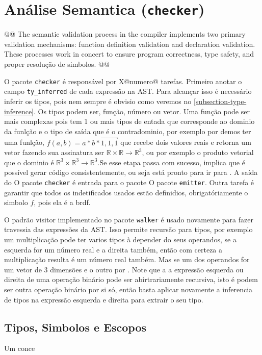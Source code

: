 
\section{Análise Semantica (\texttt{checker})} \label{section-checker}

@@ 
The semantic validation process in the compiler implements two primary validation mechanisms: function definition validation and declaration validation. These processes work in concert to ensure program correctness, type safety, and proper resolução de simbolos.
@@

O pacote \texttt{checker} é responsável por X@numero@ tarefas. Primeiro anotar o campo \verb"ty_inferred" de cada expressão na AST. Para alcançar isso é necessário inferir os tipos, pois nem sempre é obvisio como veremos no \autoref{subsection-type-inference}. Os tipos podem ser, função, número ou vetor. Uma função pode ser mais complexas pois tem 1 ou mais tipos de entada que corresponde ao dominio da funlção e  o tipo de saída que é o contradominio, por exemplo por demos ter uma funlção, $f(a,b) = a*b*\vec{1,1,1}$ que recebe dois valores reais e retorna um vetor fazendo sua assinatura ser $\mathbb{R}\times\mathbb{R} \to \mathbb{R}^3$, ou por exemplo o produto vetorial que o dominio é $\mathbb{R}^3\times\mathbb{R}^3 \to \mathbb{R}^3$.Se esse etapa passa com sucesso, implica que é possível gerar código consistentemente, ou seja está pronto para ir para . A saída do O pacote \texttt{checker} é entrada para o pacote O pacote \texttt{emitter}. Outra tarefa é garantir que todos os indetificados usados estão definidios, obrigatóriamente o simbolo $f$, pois ela é a brdf.

O padrão visitor implementado no pacote \texttt{walker} é usado novamente para fazer travessia das expressões da AST. Isso permite recursão para tipos, por exemplo um multiplicação pode ter varios tipos à depender do seus operandos, se a esquerda for um número real e a direita também, então com certeza a multiplicação resulta é um número real também. Mas se um dos operandos for um vetor de 3 dimensões e o outro por . Note que a a expressão esquerda ou direita de uma operação binário pode ser abirtrariamente recursiva, isto é podem ser outra operação binário por si só, então basta aplicar novamente a inferencia de tipos na expressão esquerda e direita para extrair o seu tipo.


\subsection{Tipos, Simbolos e Escopos} \label{subsection-symbols-scopes}
Um conce

